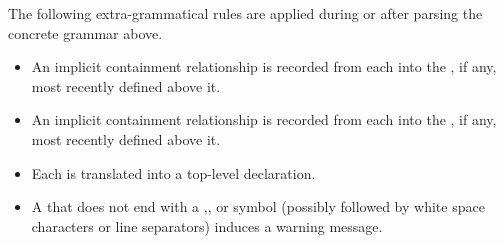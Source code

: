 \documentclass{article}
\begin{document}
The following extra-grammatical rules are applied during or after parsing the concrete grammar above.

\begin{itemize}
\item 
  An implicit containment relationship is recorded from each  into the
  , if any, most recently defined above it.
\item
  An implicit containment relationship is recorded from each  into the
  , if any, most recently defined above it.
\item 
  Each  is translated into a top-level  declaration.
\item
  A  that does not end with a ,\gtkc{!}, or  symbol
(possibly followed by white space characters or line separators) induces a warning message.
\end{itemize}
\end{document}
